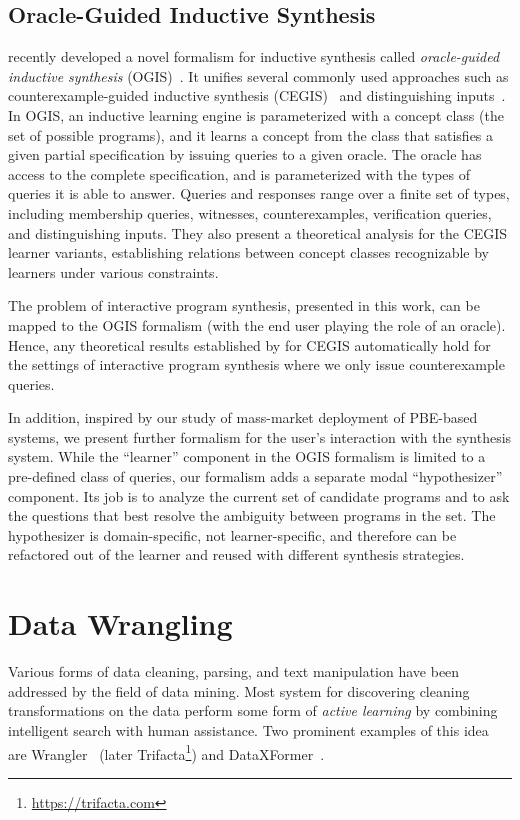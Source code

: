 \subsection{Oracle-Guided Inductive Synthesis}
\citeauthor{ogis} recently developed a novel formalism for inductive synthesis called \emph{oracle-guided inductive
synthesis} (OGIS)~\cite{ogis}.
It unifies several commonly used approaches such as counterexample-guided inductive synthesis (CEGIS)~\cite{sketch} and
distinguishing inputs~\cite{bitvectors}.
In OGIS, an inductive learning engine is parameterized with a concept class (the set of possible programs), and it
learns a concept from the class that satisfies a given partial specification by issuing queries to a given oracle.
The oracle has access to the complete specification, and is parameterized with the types of queries it is able to
answer.
Queries and responses range over a finite set of types, including membership queries, witnesses, counterexamples,
verification queries, and distinguishing inputs.
They also present a theoretical analysis for the CEGIS learner variants, establishing relations between concept classes
recognizable by learners under various constraints.

The problem of interactive program synthesis, presented in this work, can be mapped to the OGIS formalism (with the end
user playing the role of an oracle).
Hence, any theoretical results established by \citeauthor{ogis} for CEGIS automatically hold for the settings of
interactive program synthesis where we only issue counterexample queries.

In addition, inspired by our study of mass-market deployment of PBE-based systems, we present further formalism for the
user's interaction with the synthesis system.
While the ``learner'' component in the OGIS formalism is limited to a pre-defined class of queries, our formalism adds a
separate modal ``hypothesizer'' component.
Its job is to analyze the current set of candidate programs and to ask the questions that best resolve the ambiguity
between programs in the set.
The hypothesizer is domain-specific, not learner-specific, and therefore can be refactored out of the learner and
reused with different synthesis strategies.

\section{Data Wrangling}

Various forms of data cleaning, parsing, and text manipulation have been addressed by the field of data mining.
Most system for discovering cleaning transformations on the data perform some form of \emph{active learning} by
combining intelligent search with human assistance.
Two prominent examples of this idea are Wrangler~\cite{wrangler} (later Trifacta\footnote{\url{https://trifacta.com}})
and DataXFormer~\cite{dataxformer}.

